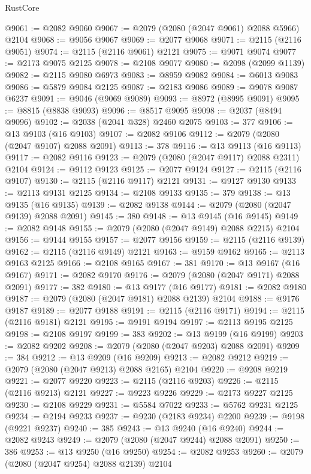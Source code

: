 \begin{lexlean}{RustCore}
\begin{coremodule}
@9061 := @2082 @9060
@9067 := @2079 (@2080 (@2047 @9061) @2088 @5966) @2104
@9068 := @9056 @9067
@9069 := @2077 @9068
@9071 := @2115 (@2116 @9051)
@9074 := @2115 (@2116 @9061) @2121
@9075 := @9071 @9074
@9077 := @2173 @9075 @2125
@9078 := @2108 @9077
@9080 := @2098 (@2099 @1139)
@9082 := @2115 @9080 @6973
@9083 := @8959 @9082
@9084 := @6013 @9083
@9086 := @5879 @9084 @2125
@9087 := @2183 @9086
@9089 := @9078 @9087 @6237
@9091 := @9046 (@9069 @9089)
@9093 := @8972 (@8995 @9091)
@9095 := @8815 (@8838 @9093)
@9096 := @8517 @9095
@9098 := @2037 (@8494 @9096)
@9102 := @2038 (@2041 @328) @2460 @2075
@9103 := 377
@9106 := @13 @9103 (@16 @9103)
@9107 := @2082 @9106
@9112 := @2079 (@2080 (@2047 @9107) @2088 @2091)
@9113 := 378
@9116 := @13 @9113 (@16 @9113)
@9117 := @2082 @9116
@9123 := @2079 (@2080 (@2047 @9117) @2088 @2311) @2104
@9124 := @9112 @9123
@9125 := @2077 @9124
@9127 := @2115 (@2116 @9107)
@9130 := @2115 (@2116 @9117) @2121
@9131 := @9127 @9130
@9133 := @2113 @9131 @2125
@9134 := @2108 @9133
@9135 := 379
@9138 := @13 @9135 (@16 @9135)
@9139 := @2082 @9138
@9144 := @2079 (@2080 (@2047 @9139) @2088 @2091)
@9145 := 380
@9148 := @13 @9145 (@16 @9145)
@9149 := @2082 @9148
@9155 := @2079 (@2080 (@2047 @9149) @2088 @2215) @2104
@9156 := @9144 @9155
@9157 := @2077 @9156
@9159 := @2115 (@2116 @9139)
@9162 := @2115 (@2116 @9149) @2121
@9163 := @9159 @9162
@9165 := @2113 @9163 @2125
@9166 := @2108 @9165
@9167 := 381
@9170 := @13 @9167 (@16 @9167)
@9171 := @2082 @9170
@9176 := @2079 (@2080 (@2047 @9171) @2088 @2091)
@9177 := 382
@9180 := @13 @9177 (@16 @9177)
@9181 := @2082 @9180
@9187 := @2079 (@2080 (@2047 @9181) @2088 @2139) @2104
@9188 := @9176 @9187
@9189 := @2077 @9188
@9191 := @2115 (@2116 @9171)
@9194 := @2115 (@2116 @9181) @2121
@9195 := @9191 @9194
@9197 := @2113 @9195 @2125
@9198 := @2108 @9197
@9199 := 383
@9202 := @13 @9199 (@16 @9199)
@9203 := @2082 @9202
@9208 := @2079 (@2080 (@2047 @9203) @2088 @2091)
@9209 := 384
@9212 := @13 @9209 (@16 @9209)
@9213 := @2082 @9212
@9219 := @2079 (@2080 (@2047 @9213) @2088 @2165) @2104
@9220 := @9208 @9219
@9221 := @2077 @9220
@9223 := @2115 (@2116 @9203)
@9226 := @2115 (@2116 @9213) @2121
@9227 := @9223 @9226
@9229 := @2173 @9227 @2125
@9230 := @2108 @9229
@9231 := @5584 @7022
@9233 := @5762 @9231 @2125
@9234 := @2194 @9233
@9237 := @9230 (@2183 @9234) @2200
@9239 := @9198 (@9221 @9237)
@9240 := 385
@9243 := @13 @9240 (@16 @9240)
@9244 := @2082 @9243
@9249 := @2079 (@2080 (@2047 @9244) @2088 @2091)
@9250 := 386
@9253 := @13 @9250 (@16 @9250)
@9254 := @2082 @9253
@9260 := @2079 (@2080 (@2047 @9254) @2088 @2139) @2104

\end{coremodule}
\end{lexlean}

